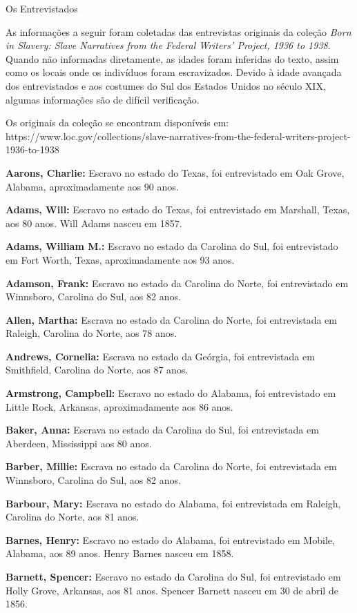 Os Entrevistados

As informações a seguir foram coletadas das entrevistas originais da
coleção \emph{Born in Slavery: Slave Narratives from the Federal
Writers' Project, 1936 to 1938}. Quando não informadas diretamente, as
idades foram inferidas do texto, assim como os locais onde os indivíduos
foram escravizados. Devido à idade avançada dos entrevistados e aos
costumes do Sul dos Estados Unidos no século XIX, algumas informações
são de difícil verificação.

Os originais da coleção se encontram disponíveis em:
https://www.loc.gov/collections/slave-narratives-from-the-federal-writers-project-1936-to-1938

\textbf{Aarons, Charlie:} Escravo no estado do Texas, foi entrevistado
em Oak Grove, Alabama, aproximadamente aos 90 anos.

\textbf{Adams, Will:} Escravo no estado do Texas, foi entrevistado em
Marshall, Texas, aos 80 anos. Will Adams nasceu em 1857.

\textbf{Adams, William M.:} Escravo no estado da Carolina do Sul, foi
entrevistado em Fort Worth, Texas, aproximadamente aos 93 anos.

\textbf{Adamson, Frank:} Escravo no estado da Carolina do Norte, foi
entrevistado em Winnsboro, Carolina do Sul, aos 82 anos.

\textbf{Allen, Martha:} Escrava no estado da Carolina do Norte, foi
entrevistada em Raleigh, Carolina do Norte, aos 78 anos.

\textbf{Andrews, Cornelia:} Escrava no estado da Geórgia, foi
entrevistada em Smithfield, Carolina do Norte, aos 87 anos.

\textbf{Armstrong, Campbell:} Escravo no estado do Alabama, foi
entrevistado em Little Rock, Arkansas, aproximadamente aos 86 anos.

\textbf{Baker, Anna:} Escrava no estado da Carolina do Sul, foi
entrevistada em Aberdeen, Mississippi aos 80 anos.

\textbf{Barber, Millie:} Escrava no estado da Carolina do Norte, foi
entrevistada em Winnsboro, Carolina do Sul, aos 82 anos.

\textbf{Barbour, Mary:} Escrava no estado do Alabama, foi entrevistada
em Raleigh, Carolina do Norte, aos 81 anos.

\textbf{Barnes, Henry:} Escravo no estado do Alabama, foi entrevistado
em Mobile, Alabama, aos 89 anos. Henry Barnes nasceu em 1858.

\textbf{Barnett, Spencer:} Escravo no estado da Carolina do Sul, foi
entrevistado em Holly Grove, Arkansas, aos 81 anos. Spencer Barnett
nasceu em 30 de abril de 1856.

